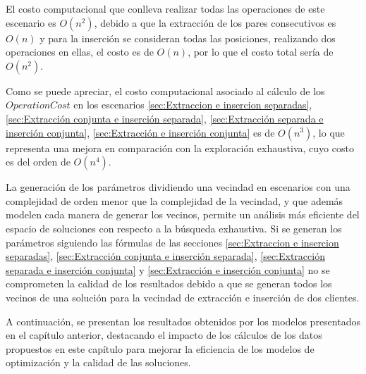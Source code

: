 \documentclass[12pt]{report}
\begin{document}
	El costo computacional que conlleva realizar todas las operaciones de este escenario es $O(n^2)$, debido a que la extracción de los pares consecutivos es $O(n)$ y para la inserción se consideran todas las posiciones, realizando dos operaciones en ellas, el costo es de $O(n)$, por lo que el costo total sería de $O(n^2)$.

	Como se puede apreciar, el costo computacional asociado al cálculo de los $OperationCost$ en los escenarios \ref{sec:Extraccion e insercion separadas}, \ref{sec:Extracción conjunta e inserción separada}, \ref{sec:Extracción separada e inserción conjunta}, \ref{sec:Extracción e inserción conjunta} es de $O(n^3)$, lo que representa una mejora en comparación con la exploración exhaustiva, cuyo costo es del orden de $O(n^4)$.

	La generación de los parámetros dividiendo una vecindad en escenarios con una complejidad de orden menor que la complejidad de la vecindad, y que además modelen cada manera de generar los vecinos, permite un análisis más eficiente del espacio de soluciones con respecto a la búsqueda exhaustiva. Si se generan los parámetros siguiendo las fórmulas de las secciones \ref{sec:Extraccion e insercion separadas}, \ref{sec:Extracción conjunta e inserción separada}, \ref{sec:Extracción separada e inserción conjunta} y \ref{sec:Extracción e inserción conjunta} no se comprometen la calidad de los resultados debido a que se generan todos los vecinos de una solución para la vecindad de extracción e inserción de dos clientes.

	A continuación, se presentan los resultados obtenidos por los modelos presentados en el capítulo anterior, destacando el impacto de los cálculos de los datos propuestos en este capítulo para mejorar la eficiencia de los modelos de optimización y la calidad de las soluciones.
\end{document}
